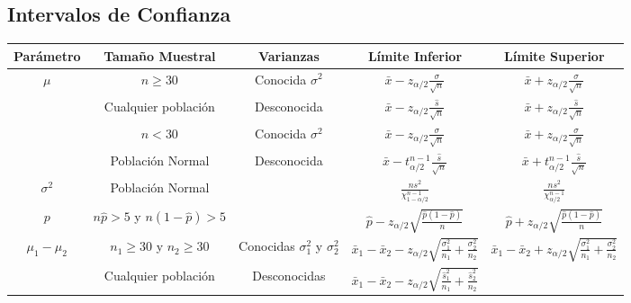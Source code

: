 \documentclass[a4paper,landscape]{article}
\begin{document}
\begin{center}
\section*{Intervalos de Confianza}
\begin{tabular}{|c|c|c|c|c|}
  \hline
  \textbf{Parámetro} & \textbf{Tamaño Muestral} & \textbf{Varianzas} & \textbf{Límite Inferior} & \textbf{Límite Superior}\\
  \hline\hline
  \rule[-.4cm]{0cm}{1cm} $\mu$ & $n\geq 30$ & Conocida $\sigma^2$ &  $\displaystyle \bar{x}-z_{\alpha/2}\frac{\sigma}{\sqrt{n}}$ &
   $\displaystyle \bar{x}+z_{\alpha/2}\frac{\sigma}{\sqrt{n}}$ \\ \cline{3-5}
  \rule[-.4cm]{0cm}{1cm}  & Cualquier población  & Desconocida & $\displaystyle \bar{x}-z_{\alpha/2}\frac{\hat s}{\sqrt{n}}$ &
  $\displaystyle \bar{x}+z_{\alpha/2}\frac{\hat s}{\sqrt{n}}$ \\ \cline{2-5}
  \rule[-.4cm]{0cm}{1cm} & $n<30$ & Conocida $\sigma^2$ & $\displaystyle \bar{x}-z_{\alpha/2}\frac{\sigma}{\sqrt{n}}$ &
  $\displaystyle \bar{x}+z_{\alpha/2}\frac{\sigma}{\sqrt{n}}$ \\ \cline{3-5}
  \rule[-.4cm]{0cm}{1cm}& Población Normal & Desconocida & $\displaystyle \bar{x}-t^{n-1}_{\alpha/2}\frac{\hat s}{\sqrt{n}}$ &
  $\displaystyle \bar{x}+t^{n-1}_{\alpha/2}\frac{\hat s}{\sqrt{n}}$ \\ \hline
  \rule[-.4cm]{0cm}{1cm} $\sigma^2$ & Población Normal & & $\displaystyle \frac{ns^2}{\chi^{n-1}_{1-\alpha/2}}$ &
  $\displaystyle \frac{ns^2}{\chi^{n-1}_{\alpha/2}}$ \\ \hline
  \rule[-.4cm]{0cm}{1.1cm} $p$ & $n\hat{p}>5$ y $n(1-\hat{p})>5$ & &
  $\displaystyle \hat{p}-z_{\alpha/2}\sqrt{\frac{\hat{p}(1-\hat{p})}{n}}$ &
  $\displaystyle \hat{p}+z_{\alpha/2}\sqrt{\frac{\hat{p}(1-\hat{p})}{n}}$ \\ \hline
  \rule[-.5cm]{0cm}{1.3cm}$\mu_1-\mu_2$ & $n_1\geq 30$ y $n_2\geq 30$  & Conocidas $\sigma_1^2$ y $\sigma_2^2$ &
  $\displaystyle \bar{x}_{1}-\bar{x}_{2} -
  z_{\alpha/2}\sqrt{\frac{\sigma^2_{1}}{n_{1}}+\frac{\sigma^2_{2}}{n_{2}}}$ &
  $\displaystyle \bar{x}_{1}-\bar{x}_{2} +
  z_{\alpha/2}\sqrt{\frac{\sigma^2_{1}}{n_{1}}+\frac{\sigma^2_{2}}{n_{2}}}$ \\
  \cline{3-5}
  \rule[-.5cm]{0cm}{1.3cm} & Cualquier población & Desconocidas &
  $\displaystyle \bar{x}_{1}-\bar{x}_{2} -
  z_{\alpha/2}\sqrt{\frac{\hat s^2_1}{n_{1}}+\frac{\hat s^2_2}{n_{2}}}$ &

\end{tabular}
\end{center}
\end{document}
